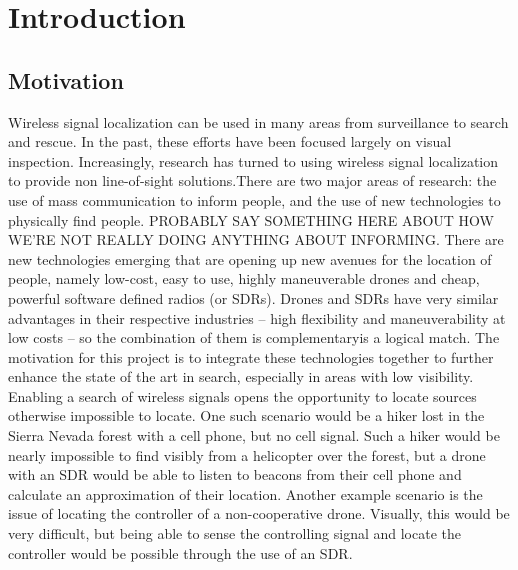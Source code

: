 \chapter{Introduction}

\section{Motivation}
Wireless signal localization can be used in many areas from surveillance to search and rescue. In the past, these efforts have been focused largely on visual inspection. Increasingly, research has turned to using wireless signal localization to provide non line-of-sight solutions.There are two major areas of research: the use of mass communication to inform people, and the use of new technologies to physically find people. PROBABLY SAY SOMETHING HERE ABOUT HOW WE’RE NOT REALLY DOING ANYTHING ABOUT INFORMING. There are new technologies emerging that are opening up new avenues for the location of people, namely low-cost, easy to use, highly maneuverable drones and cheap, powerful software defined radios (or SDRs).
Drones and SDRs have very similar advantages in their respective industries – high flexibility and maneuverability at low costs – so the combination of them is complementaryis a logical match. The motivation for this project is to integrate these technologies together to further enhance the state of the art in search, especially in areas with low visibility. Enabling a search of wireless signals opens the opportunity to locate sources otherwise impossible to locate. One such scenario would be a hiker lost in the Sierra Nevada forest with a cell phone, but no cell signal. Such a hiker would be nearly impossible to find visibly from a helicopter over the forest, but a drone with an SDR would be able to listen to beacons from their cell phone and calculate an approximation of their location. Another example scenario is the issue of locating the controller of a non-cooperative drone. Visually, this would be very difficult, but being able to sense the controlling signal and locate the controller would be possible through the use of an SDR.
